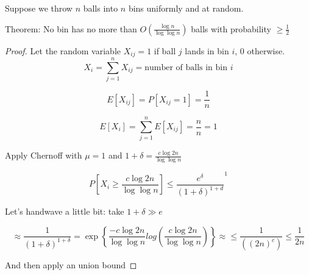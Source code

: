 \documentclass[../notes.tex]{subfiles}
\begin{document}
\begin{example}
    Suppose we throw $ n $ balls into $ n $ bins uniformly and at random.

\begin{theorem}
Theorem: No bin has no more than $ O(\frac{\log n}{ \log \log n }) $ balls with probability $ \ge  \frac{1}{2} $
\end{theorem}


\begin{proof}

Let the random variable $ X_{ij} = 1 $ if ball $ j $ lands in bin $ i $, $ 0 $ otherwise.
\begin{equation}
    X_{i} = \sum^n_{j=1} X_{ij} = \text{number of balls in bin } i
\end{equation}

\begin{equation}
    E[X_{ij}] = P[X_{ij} = 1] = \frac{1}{n}
\end{equation}

\begin{equation}
    E[X_i] = \sum^n_{j=1} E[X_{ij}] = \frac{n}{n} = 1
\end{equation} 


Apply Chernoff with $ \mu = 1 $ and $ 1+\delta = \frac{c \log 2n}{ \log \log n } $

\begin{equation}
    P[X_i \ge   \frac{c \log 2n}{ \log \log n }] \le \frac{e^\delta}{(1+\delta)^{1+d}}^1
\end{equation}


Let's handwave a little bit: take $ 1+\delta \gg e $ 

\begin{equation}
    \approx \frac{1}{(1+\delta)^{1+\delta}} = \exp \left\{ \frac{-c \log 2n}{\log \log n} 
        log \left( \frac{c \log 2n}{\log \log n} \right) \right\}
    \approx \le \frac{1}{((2n)^c)} \le  \frac{1}{2n}
\end{equation}


And then apply an union bound



    
\end{proof}

\end{example}
\end{document}
